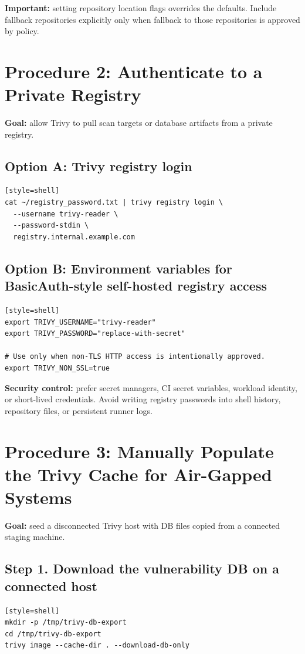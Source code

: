 \documentclass[10pt]{article}
\begin{document}
\textbf{Important:} setting repository location flags overrides the defaults. Include fallback repositories explicitly only when fallback to those repositories is approved by policy.

\section{Procedure 2: Authenticate to a Private Registry}
\textbf{Goal:} allow Trivy to pull scan targets or database artifacts from a private registry.

\subsection{Option A: Trivy registry login}
\begin{verbatim}[style=shell]
cat ~/registry_password.txt | trivy registry login \
  --username trivy-reader \
  --password-stdin \
  registry.internal.example.com
\end{verbatim}

\subsection{Option B: Environment variables for BasicAuth-style self-hosted registry access}
\begin{verbatim}[style=shell]
export TRIVY_USERNAME="trivy-reader"
export TRIVY_PASSWORD="replace-with-secret"

# Use only when non-TLS HTTP access is intentionally approved.
export TRIVY_NON_SSL=true
\end{verbatim}

\textbf{Security control:} prefer secret managers, CI secret variables, workload identity, or short-lived credentials. Avoid writing registry passwords into shell history, repository files, or persistent runner logs.

\section{Procedure 3: Manually Populate the Trivy Cache for Air-Gapped Systems}
\textbf{Goal:} seed a disconnected Trivy host with DB files copied from a connected staging machine.

\subsection{Step 1. Download the vulnerability DB on a connected host}
\begin{verbatim}[style=shell]
mkdir -p /tmp/trivy-db-export
cd /tmp/trivy-db-export
trivy image --cache-dir . --download-db-only
\end{verbatim}
\end{document}
